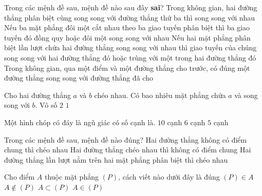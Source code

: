\begin{ex}%
	Trong các mệnh đề sau, mệnh đề nào sau  đây {\bf sai}?
	\choice 
		{Trong  không gian, hai đường thẳng phân biệt cùng song song với đường thẳng thứ ba thì song song với nhau}
		{Nếu ba mặt phẳng đôi một cắt nhau  theo ba giao tuyến phân biệt thì ba giao tuyến đó đồng quy hoặc đôi một song song với nhau}
		{Nếu hai mặt phẳng phân biệt lần lượt chứa hai đường thẳng song song với nhau thì giao tuyến của  chúng song song với hai đường thẳng đó hoặc trùng với một trong hai đường thẳng đó}
		{\True Trong không gian, qua một điểm và một đường  thẳng cho trước, có đúng một đường thẳng song song với đường thẳng đã cho}
\end{ex}

\begin{ex}%
	Cho hai đường thẳng $a$ và $b$ chéo nhau. Có bao nhiêu mặt phẳng chứa $a$ và song  song với $b$.
		 {Vô số}
		{$2$} 
		{\True $1$} 
\end{ex}

\begin{ex}%
	Một hình  chóp có đáy là ngũ giác có số cạnh là.
		{\True  $10$ cạnh}
		{$6$ cạnh} 
		 {$5$ cạnh}
\end{ex}

\begin{ex}%
	Trong các mệnh đề sau, mệnh  đề nào đúng?
		 {Hai đường thẳng không có điểm chung thì chéo nhau}
		{\True Hai đường thẳng chéo nhau thì không  có điểm chung}
		{Hai đường thẳng lần lượt nằm trên hai mặt phẳng phân  biệt thì chéo nhau}
\end{ex}

\begin{ex}%
	Cho điểm $A$ thuộc mặt phẳng  $(P)$, cách viết nào dưới đây là đúng
	\choice 
		 {$(P)\in A$}
		{$A\notin(P)$} 
		 {$A\subset(P)$}
		{\True $A\in(P)$} 
\end{ex}

